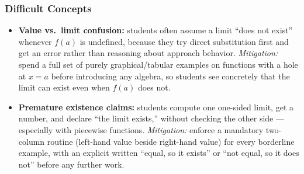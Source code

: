 \documentclass[11pt]{article}
\begin{document}
\subsubsection*{Difficult Concepts}
\begin{itemize}[leftmargin=*]
  \item \textbf{Value vs.\ limit confusion:} students often assume a limit ``does not exist'' whenever $f(a)$ is undefined, because they try direct substitution first and get an error rather than reasoning about approach behavior. \textit{Mitigation:} spend a full set of purely graphical/tabular examples on functions with a hole at $x=a$ before introducing any algebra, so students see concretely that the limit can exist even when $f(a)$ does not.
  \item \textbf{Premature existence claims:} students compute one one-sided limit, get a number, and declare ``the limit exists,'' without checking the other side --- especially with piecewise functions. \textit{Mitigation:} enforce a mandatory two-column routine (left-hand value beside right-hand value) for every borderline example, with an explicit written ``equal, so it exists'' or ``not equal, so it does not'' before any further work.
\end{itemize}
\end{document}
